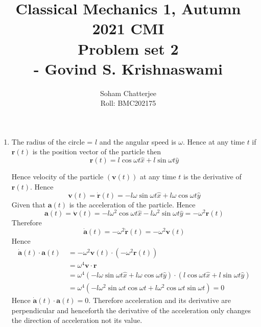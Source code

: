 \documentclass{article}
\title{\huge{Classical Mechanics 1, Autumn 2021 CMI \\ Problem set 2\\\hspace{7cm}- Govind S. Krishnaswami}
}
\author{Soham Chatterjee\\Roll: BMC202175}
\date{}
\begin{document}
	\maketitle
	\pagebreak
	
\begin{enumerate}
	\item The radius of the circle = $l$ and the angular speed is $\omega$. Hence at any time $t$ if $\boldsymbol{r}(t)$ is the position vector of the particle then$$\boldsymbol{r}(t)=l\cos\omega t \hat{x}+l\sin\omega t\hat{y}$$
	\begin{center}
	\end{center}
		Hence velocity of the particle $(\boldsymbol{v}(t))$ at any time $t$ is the derivative of $\boldsymbol{r}(t)$. Hence$$\boldsymbol{v}(t)=\dot{\boldsymbol{r}}(t)=-l\omega\sin\omega t\hat{x}+l\omega\cos\omega t\hat{y}$$
		Given that $\boldsymbol{a}(t)$ is the acceleration of the particle. Hence$$\boldsymbol{a}(t)=\dot{\boldsymbol{v}}(t)=-l\omega^2\cos\omega t\hat{x}-l\omega^2\sin\omega t\hat{y}=-\omega^2\boldsymbol{r}(t)$$Therefore$$\dot{\boldsymbol{a}}(t)=-\omega^2\dot{\boldsymbol{r}}(t)=-\omega^2\boldsymbol{v}(t)$$Hence \begin{align*}
			\dot{\boldsymbol{a}}(t)\cdot\boldsymbol{a}(t)\ &=-\omega^2\boldsymbol{v}(t)\cdot (-\omega^2\boldsymbol{r}(t))\\
			& =\omega^4\boldsymbol{v}\cdot\boldsymbol{r}\\
			&=\omega^4(-l\omega\sin\omega t\hat{x}+l\omega\cos\omega t\hat{y})\cdot (l\cos\omega t \hat{x}+l\sin\omega t\hat{y})\\
			&=\omega^4(-l\omega^2\sin\omega t\cos\omega t+l\omega^2\cos\omega t\sin \omega t)=0
		\end{align*}
	Hence $\dot{\boldsymbol{a}}(t)\cdot\boldsymbol{a}(t)=0$. Therefore acceleration and its derivative are perpendicular and henceforth the derivative of the acceleration only changes the direction of acceleration not its value.

\end{enumerate}
\end{document}
